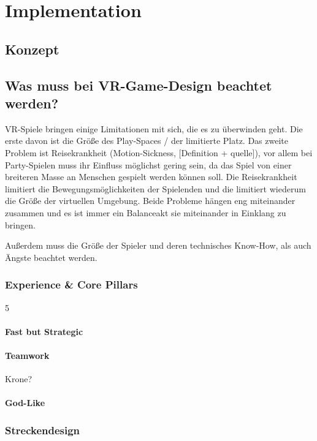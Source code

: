 \chapter{Implementation}

\section{Konzept}

\section{Was muss bei VR-Game-Design beachtet werden?}

VR-Spiele bringen einige Limitationen mit sich, die es zu überwinden geht. Die erste davon ist die Größe des Play-Spaces / der limitierte Platz. Das zweite Problem ist Reisekrankheit (Motion-Sickness, [Definition + quelle]), vor allem bei Party-Spielen muss ihr Einfluss möglichst gering sein, da das Spiel von einer breiteren Masse an Menschen gespielt werden können soll. Die Reisekrankheit limitiert die Bewegungsmöglichkeiten der Spielenden und die limitiert wiederum die Größe der virtuellen Umgebung. Beide Probleme hängen eng miteinander zusammen und es ist immer ein Balanceakt sie miteinander in Einklang zu bringen. 

Außerdem muss die Größe der Spieler und deren technisches Know-How, als auch Ängste beachtet werden. 

\subsection{Experience \& Core Pillars}5

\subsubsection{Fast but Strategic}

\subsubsection{Teamwork}
Krone?

\subsubsection{God-Like}

\subsection{Streckendesign}

